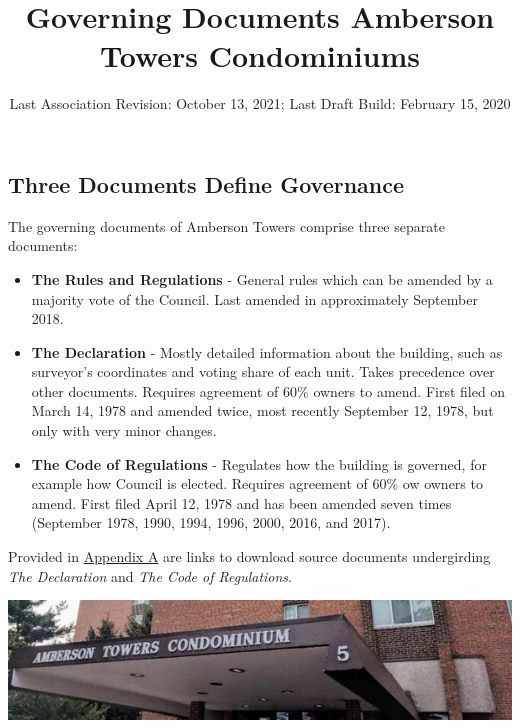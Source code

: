 \documentclass[
  14pt,
]{book}
\title{Governing Documents Amberson Towers Condominiums}
\author{}
\date{\vspace{-2.5em}Last Association Revision: October 13, 2021; Last Draft Build: February 15, 2020}
\begin{document}
\maketitle

{
\setcounter{tocdepth}{1}
\tableofcontents
}
\hypertarget{section}{%
\chapter*{}\label{section}}

\hypertarget{three-documents-define-governance}{%
\section*{Three Documents Define Governance}\label{three-documents-define-governance}}

The governing documents of Amberson Towers comprise three separate documents:

\begin{itemize}
\item
  \textbf{The Rules and Regulations} - General rules which can be amended by a majority vote of the Council. Last amended in approximately September 2018.
\item
  \textbf{The Declaration} - Mostly detailed information about the building, such as surveyor's coordinates and voting share of each unit. Takes precedence over other documents. Requires agreement of 60\% owners to amend. First filed on March 14, 1978 and amended twice, most recently September 12, 1978, but only with very minor changes.
\item
  \textbf{The Code of Regulations} - Regulates how the building is governed, for example how Council is elected. Requires agreement of 60\% ow owners to amend. First filed April 12, 1978 and has been amended seven times (September 1978, 1990, 1994, 1996, 2000, 2016, and 2017).
\end{itemize}

Provided in \protect\hyperlink{documents}{Appendix A} are links to download source documents undergirding \emph{The Declaration} and \emph{The Code of Regulations}.

\includegraphics{amber3.jpg}
\end{document}
